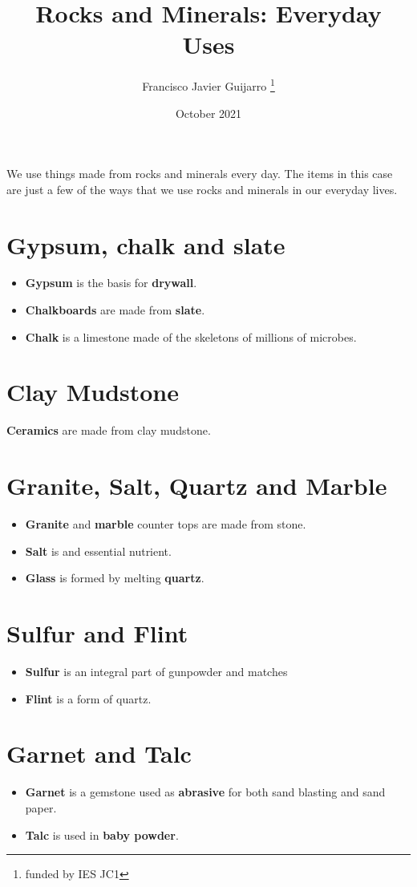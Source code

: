 \documentclass[12pt, letterpaper, twoside]{article}
\title{Rocks and Minerals: Everyday Uses}
\author{Francisco Javier Guijarro \thanks{funded by IES JC1}}
\date{October 2021}
\begin{document}
\maketitle
We use things made from rocks and minerals every day. The items in this case are just a few of the ways that we use rocks and minerals in our everyday lives.

\section{Gypsum, chalk and slate}
	\begin{itemize}
		\item \textbf{Gypsum} is the basis for \textbf{drywall}.
		\item \textbf{Chalkboards} are made from \textbf{slate}.
		\item \textbf{Chalk} is a limestone made of the skeletons of millions of microbes.
	\end{itemize}
	
\section{Clay Mudstone}
\textbf{Ceramics} are made from clay mudstone.

\section{Granite, Salt, Quartz and Marble}
	\begin{itemize}
		\item \textbf{Granite} and \textbf{marble} counter tops are made from stone.
		\item \textbf{Salt} is and essential nutrient.
		\item \textbf{Glass} is formed by melting \textbf{quartz}.
	\end{itemize}
	

\section{Sulfur and Flint}
	\begin{itemize}
		\item \textbf{Sulfur} is an integral part of gunpowder and matches
		\item \textbf{Flint} is a form of quartz.
	\end{itemize}

\section{Garnet and Talc}
	\begin{itemize}
		\item \textbf{Garnet} is a gemstone used as \textbf{abrasive} for both sand blasting and sand paper.
		\item \textbf {Talc} is used in \textbf{baby powder}.
	\end{itemize}
	
\end{document}
